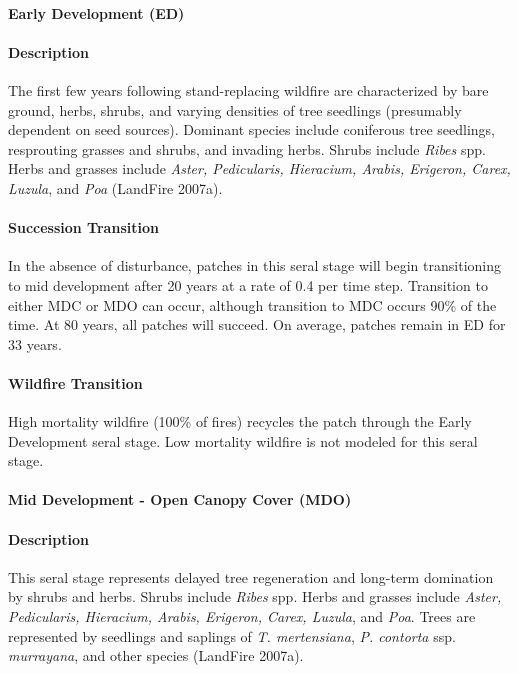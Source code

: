 \paragraph{Early Development (ED)}

\paragraph{Description} The first few years following stand-replacing wildfire are characterized by bare ground, herbs, shrubs, and varying densities of tree seedlings (presumably dependent on seed sources). Dominant species include coniferous tree seedlings, resprouting grasses and shrubs, and invading herbs. Shrubs include \emph{Ribes} spp. Herbs and grasses include \emph{Aster, Pedicularis, Hieracium, Arabis, Erigeron, Carex, Luzula}, and \emph{Poa} (LandFire 2007a).

\paragraph{Succession Transition} In the absence of disturbance, patches in this seral stage will begin transitioning to mid development after 20 years at a rate of 0.4 per time step. Transition to either MDC or MDO can occur, although transition to MDC occurs 90\% of the time. At 80 years, all patches will succeed. On average, patches remain in ED for 33 years.

\paragraph{Wildfire Transition} High mortality wildfire (100\% of fires) recycles the patch through the Early Development seral stage. Low mortality wildfire is not modeled for this seral stage.

\noindent\hrulefill


\paragraph{Mid Development - Open Canopy Cover (MDO)} 

\paragraph{Description} This seral stage represents delayed tree regeneration and long-term domination by shrubs and herbs. Shrubs include \emph{Ribes} spp. Herbs and grasses include \emph{Aster, Pedicularis, Hieracium, Arabis, Erigeron, Carex, Luzula}, and \emph{Poa}. Trees are represented by seedlings and saplings of \emph{T. mertensiana}, \emph{P. contorta} ssp. \emph{murrayana}, and other species (LandFire 2007a).

